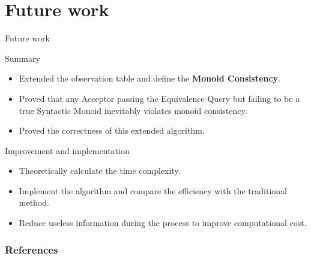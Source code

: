 \documentclass{beamer}
\begin{document}
\section{Future work}

\begin{frame}{Future work}
    \begin{block}{Summary}
        \begin{itemize}
            \item Extended the observation table and define the \textbf{Monoid Consistency}. 
            \item Proved that any Acceptor passing the Equivalence Query but failing to be a true Syntactic Monoid inevitably violates monoid consistency.
            \item Proved the correctness of this extended algorithm.
        \end{itemize}
    \end{block}
    \begin{block}{Improvement and implementation}
        \begin{itemize}
            \item Theoretically calculate the time complexity.
            \item Implement the algorithm and compare the efficiency with the traditional method. 
            \item Reduce useless information during the process to improve computational cost. 
        \end{itemize}
    \end{block}
\end{frame}

\begin{frame}[allowframebreaks] 
    \frametitle{References}
    
    
     
\end{frame}
\end{document}
